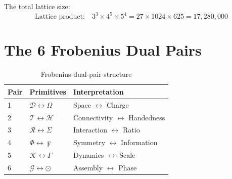 \documentclass[11pt,a4paper,twocolumn]{article}
\begin{document}
The total lattice size:
\begin{equation}
\text{Lattice product:}\quad 3^3 \times 4^5 \times 5^4 = 27 \times 1024 \times 625 = 17{,}280{,}000
\end{equation}

\section{The 6 Frobenius Dual Pairs}

\begin{table}[h]
\centering
\caption{Frobenius dual-pair structure}
\small
\begin{tabular}{lll}
\toprule
Pair & Primitives & Interpretation \\
\midrule
1 & $\mathcal{D} \leftrightarrow \Omega$ & Space $\leftrightarrow$ Charge \\
2 & $\mathcal{T} \leftrightarrow \mathcal{H}$ & Connectivity $\leftrightarrow$ Handedness \\
3 & $\mathcal{R} \leftrightarrow \Sigma$ & Interaction $\leftrightarrow$ Ratio \\
4 & $\Phi \leftrightarrow \digamma$ & Symmetry $\leftrightarrow$ Information \\
5 & $\mathcal{K} \leftrightarrow \Gamma$ & Dynamics $\leftrightarrow$ Scale \\
6 & $\mathcal{G} \leftrightarrow \odot$ & Assembly $\leftrightarrow$ Phase \\
\bottomrule
\end{tabular}
\end{table}
\end{document}
